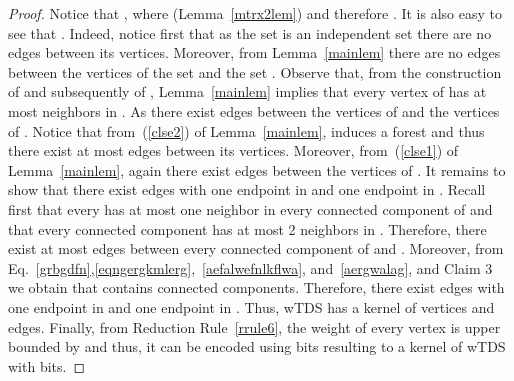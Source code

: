 \documentclass[a4paper,11pt]{article}
\begin{document}
\begin{proof}
Notice that , where  (Lemma~\ref{mtrx2lem}) and therefore .
It is also easy to see that . Indeed, notice first that as the set  is an independent set there are no edges between its vertices. Moreover,
from Lemma~\ref{mainlem} there are no edges between the vertices of the set  and the set . Observe that, from the construction of  and subsequently
of , Lemma~\ref{mainlem} implies that every vertex of  has at most  neighbors in . As  there exist 
edges between the vertices of  and the vertices of . Notice that from~(\ref{clse2}) of Lemma~\ref{mainlem},  induces a forest and thus there 
exist at most  edges between its vertices. Moreover, from~(\ref{clse1}) of Lemma~\ref{mainlem}, again there exist  edges between the 
vertices of . It remains to show that there exist  edges with one endpoint in  and one endpoint in . Recall first that 
every  has at most one neighbor in every  connected component of  and that every connected component has at most 2 neighbors in
. Therefore, there exist at most  edges between every connected component of  and . 
Moreover, from Eq.~\eqref{grbgdfn},\eqref{eqngergkmlerg},~\eqref{aefalwefnlkflwa}, and~\eqref{aergwalag}, and Claim 3 we obtain that  contains 
 connected components. Therefore, there exist  edges with one endpoint in  and one endpoint in .
Thus, {\sc wTDS} has a kernel of  vertices and edges. 
Finally, from Reduction Rule~\ref{rrule6}, the weight of every vertex is upper bounded by  and thus, it can be encoded using  bits resulting to a
kernel of {\sc  wTDS} with  bits.
\end{proof}
\newpage


\end{document}
